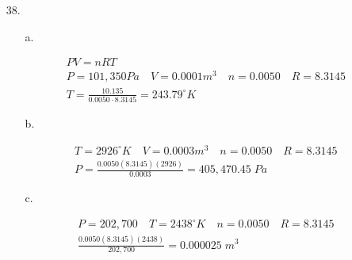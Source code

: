 \documentclass[12pt, letterpaper]{article}
\begin{document}
\begin{enumerate}
        \pagebreak
        
        \item [38.]
        \begin{itemize}
            \item [a.] \mbox{}
            \begin{mdframed}
                \begin{equation*}
                    \begin{gathered}
                        PV = nRT    \\
                        P = 101,350 Pa \quad V = 0.0001 m^{3} \quad n = 0.0050 \quad R = 8.3145   \\
                        T = \frac{10.135}{0.0050 \cdot 8.3145} = \boxed{243.79^{\circ}K}
                    \end{gathered}
                \end{equation*}
            \end{mdframed}

            \item [b.] \mbox{}
            \begin{mdframed}
                \begin{equation*}
                    \begin{gathered}
                        T = 2926^{\circ}K \quad V = 0.0003 m^{3} \quad n = 0.0050 \quad R = 8.3145   \\
                        P = \frac{0.0050(8.3145)(2926)}{0.0003} = \boxed{405,470.45\; Pa}
                    \end{gathered}
                \end{equation*}
            \end{mdframed}

            \item [c.] \mbox{}
            \begin{mdframed}
                \begin{equation*}
                    \begin{gathered}
                        P = 202,700 \quad T = 2438^{\circ}K \quad n = 0.0050 \quad R = 8.3145   \\
                         \frac{0.0050(8.3145)(2438)}{202,700} = \boxed{0.000025\; m^{3}}
                    \end{gathered}
                \end{equation*}
            \end{mdframed}
        \end{itemize}


\end{enumerate}
\end{document}
